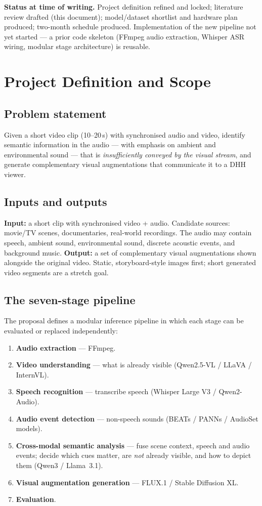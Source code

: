 \documentclass[11pt,a4paper]{article}
\begin{document}
\medskip
\noindent\textbf{Status at time of writing.} Project definition refined and locked; literature
review drafted (this document); model/dataset shortlist and hardware plan produced; two-month
schedule produced. Implementation of the new pipeline not yet started --- a prior code skeleton
(FFmpeg audio extraction, Whisper ASR wiring, modular stage architecture) is reusable.

\section{Project Definition and Scope}
\subsection{Problem statement}
Given a short video clip (10--20\,s) with synchronised audio and video, identify semantic
information in the audio --- with emphasis on ambient and environmental sound --- that is
\emph{insufficiently conveyed by the visual stream}, and generate complementary visual
augmentations that communicate it to a DHH viewer.

\subsection{Inputs and outputs}
\textbf{Input:} a short clip with synchronised video + audio. Candidate sources: movie/TV scenes,
documentaries, real-world recordings. The audio may contain speech, ambient sound, environmental
sound, discrete acoustic events, and background music.
\textbf{Output:} a set of complementary visual augmentations shown alongside the original video.
Static, storyboard-style images first; short generated video segments are a stretch goal.

\subsection{The seven-stage pipeline}
The proposal defines a modular inference pipeline in which each stage can be evaluated or replaced
independently:
\begin{enumerate}
  \item \textbf{Audio extraction} --- FFmpeg.
  \item \textbf{Video understanding} --- what is already visible (Qwen2.5-VL / LLaVA / InternVL).
  \item \textbf{Speech recognition} --- transcribe speech (Whisper Large V3 / Qwen2-Audio).
  \item \textbf{Audio event detection} --- non-speech sounds (BEATs / PANNs / AudioSet models).
  \item \textbf{Cross-modal semantic analysis} --- fuse scene context, speech and audio events;
        decide which cues matter, are \emph{not} already visible, and how to depict them
        (Qwen3 / Llama~3.1).
  \item \textbf{Visual augmentation generation} --- FLUX.1 / Stable Diffusion XL.
  \item \textbf{Evaluation}.
\end{enumerate}
\end{document}
